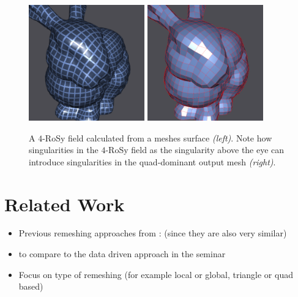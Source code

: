 \documentclass{ACGSeminar}
\begin{document}
\begin{figure}[htb!]
	\begin{centering}
		\includegraphics[width=5cm]{img/n-Rosy-Geometry.png} \includegraphics[width=5cm]{img/n-Rosy-Mesh.png}\par
	\end{centering}
	\caption{A $4$-RoSy field calculated from a meshes surface \textit{(left)}. Note how singularities in the $4$-RoSy field as the singularity above the eye can introduce singularities in the quad-dominant output mesh \textit{(right)}.}
	\label{fig:n-rosy-geometry}
\end{figure}



\section{Related Work}\label{related_work}
\begin{itemize}
	\item	Previous remeshing approaches from \cite{jakob2015instant}: \cite{ray2006periodic,bommes2009mixed} (since they are also very similar)
	\item	\cite{marcias2015data} to compare to the data driven approach in the seminar
	\item	Focus on type of remeshing (for example local or global, triangle or quad based)
\end{itemize}

\end{document}
